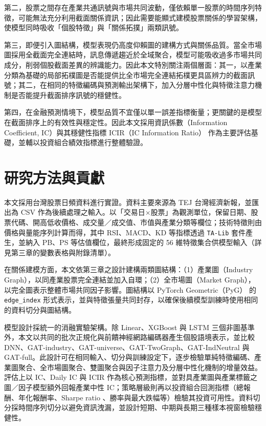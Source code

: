 第二，股票之間存在產業共通訊號與市場共同波動，僅依賴單一股票的時間序列特徵，可能無法充分利用截面關係資訊；因此需要能顯式建模股票關係的學習架構，使模型同時吸收「個股特徵」與「關係拓撲」兩類訊號。

第三，即便引入圖結構，模型表現仍高度仰賴圖的建構方式與關係品質。當全市場圖採用全截面完全連結時，訊息傳遞趨近於全域聚合，模型可能吸收過多市場共同成分，削弱個股截面差異的辨識能力。因此本文特別關注兩個層面：其一，以產業分類為基礎的局部拓樸圖是否能提供比全市場完全連結拓樸更具區辨力的截面訊號；其二，在相同的特徵編碼與預測輸出架構下，加入分層中性化與特徵注意力機制是否能提升截面排序訊號的穩健性。

第四，在金融預測情境下，模型品質不宜僅以單一誤差指標衡量；更關鍵的是模型在截面排序上的有效性與穩定性。因此本文採用資訊係數（Information Coefficient, IC）與其穩健性指標 ICIR（IC Information Ratio）\cite{qian2004active_risk, ye2008signal_quality} 作為主要評估基礎，並輔以投資組合績效指標進行整體驗證。

\section{研究方法與貢獻}
\label{sec:contribution}

本文採用台灣股票日頻資料進行實證。資料主要來源為 TEJ 台灣經濟新報，並匯出為 CSV 作為後續處理之輸入。以「交易日\(\times\)股票」為觀測單位，保留日期、股票代碼、開高低收價格、成交量／成交值、市值與產業分類等欄位；技術特徵則由價格與量能序列計算而得，其中 RSI、MACD、KD 等指標透過 \texttt{TA-Lib} 套件產生，並納入 PB、PS 等估值欄位，最終形成固定的 56 維特徵集合供模型輸入（詳見第三章的變數表格與附錄清單）。

在關係建模方面，本文依第三章之設計建構兩類圖結構：（1）產業圖（Industry Graph），以同產業股票完全連結並加入自環；（2）全市場圖（Market Graph），以完全圖表示整體市場共同因子影響。圖結構以 PyTorch Geometric（PyG）\cite{fey2019pyg} 的 \texttt{edge\_index} 形式表示，並與特徵張量共同封存，以確保後續模型訓練時使用相同的資料切分與圖結構。

模型設計採統一的消融實驗架構。除 Linear、XGBoost \cite{Chen2016XGBoost} 與 LSTM \cite{hochreiter1997lstm} 三個非圖基準外，本文以共同的批次正規化與前饋神經網路編碼器產生個股語境表示，並比較 DNN、GAT-industry、GAT-universe、GAT-TwoGraph、GAT-IndNeutral 與 GAT-full。此設計可在相同輸入、切分與訓練設定下，逐步檢驗單純特徵編碼、產業圖聚合、全市場圖聚合、雙圖聚合與因子注意力及分層中性化機制的增量效益。評估上以 IC、Daily IC 與 ICIR \cite{qian2004active_risk, ye2008signal_quality} 作為核心預測指標，並對具產業圖與產業標籤之圖／因子模型額外回報產業中性 IC；策略層級則再以投資組合回測指標（總報酬、年化報酬率、Sharpe ratio \cite{sharpe1994ratio}、勝率與最大跌幅等）檢驗其投資可用性。資料切分採時間序列切分以避免資訊洩漏，並設計短期、中期與長期三種樣本視窗檢驗穩健性。

